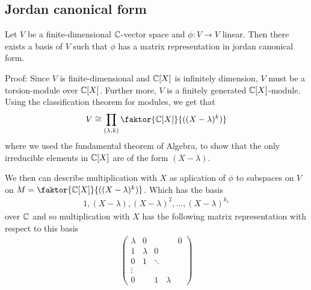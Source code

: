 \subsection{Jordan canonical form}

\begin{theorem}[]
	Let $V$ be a finite-dimensional $\mathbb{C}$-vector space and $\phi: V \to V$ linear. Then there exists a basis of $V$ such that $\phi$ has a matrix representation in jordan canonical form.
\end{theorem}
Proof: Since $V$ is finite-dimensional and $\mathbb{C}[X]$ is infinitely dimension, $V$ must be a torsion-module over $\mathbb{C}[X]$. Further more, $V$ is a finitely generated $\mathbb{C}[X]$-module. Using the classification theorem for modules, we get that
\begin{align*}
	V \iso \prod_{(\lambda,k)} \faktor{\C[X]}{((X-\lambda)^{k})}
\end{align*}
where we used the fundamental theorem of Algebra, to show that the only irreducible elements in $\mathbb{C}[X]$ are of the form $(X - \lambda)$.

We then can describe multiplication with $X$ as aplication of $\phi$ to subspaces on $V$ on $M = \faktor{\C[X]}{((X - \lambda)^k)}$. Which has the basis
\begin{align*}
	1, (X - \lambda), (X - \lambda)^{2}, \ldots, (X - \lambda)^{k_1}
\end{align*}
over $\mathbb{C}$ and so multiplication with $X$ has the following matrix representation with respect to this basis
\begin{align*}
	\begin{pmatrix}
	\lambda & 0 &  &  & 0\\
	1 & \lambda & 0 &  & \\
	0 & 1 & \ddots &  & \\
	\vdots &  &  &  & \\
	0 &  & 1 &  \lambda& 
	\end{pmatrix}
\end{align*}


